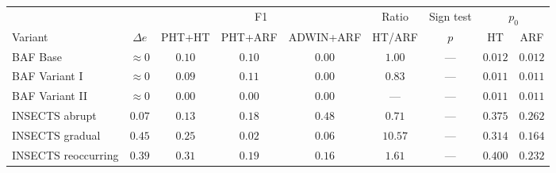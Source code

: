 \begin{tabular}{@{}lcccccccc@{}}
\toprule
 & & \multicolumn{3}{c}{F1} & Ratio & Sign test & \multicolumn{2}{c}{$p_0$} \\
\cmidrule(lr){3-5}\cmidrule(lr){8-9}
Variant & $\Delta e$ & PHT+HT & PHT+ARF & ADWIN+ARF & HT/ARF & $p$ & HT & ARF \\
\midrule
BAF Base & $\approx 0$ & $0.10$ & $0.10$ & $0.00$ & $1.00$ & --- & $0.012$ & $0.012$ \\
BAF Variant I & $\approx 0$ & $0.09$ & $0.11$ & $0.00$ & $0.83$ & --- & $0.011$ & $0.011$ \\
BAF Variant II & $\approx 0$ & $0.00$ & $0.00$ & $0.00$ & --- & --- & $0.011$ & $0.011$ \\
INSECTS abrupt & $0.07$ & $0.13$ & $0.18$ & $0.48$ & $0.71$ & --- & $0.375$ & $0.262$ \\
INSECTS gradual & $0.45$ & $0.25$ & $0.02$ & $0.06$ & $10.57$ & --- & $0.314$ & $0.164$ \\
INSECTS reoccurring & $0.39$ & $0.31$ & $0.19$ & $0.16$ & $1.61$ & --- & $0.400$ & $0.232$ \\
\bottomrule
\end{tabular}
